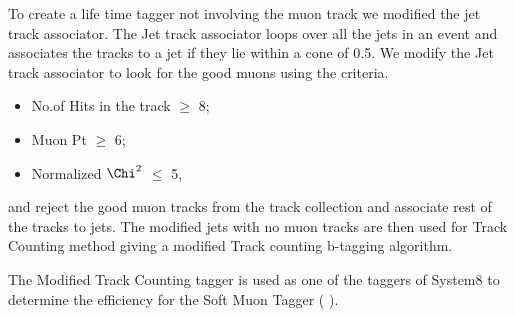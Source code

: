 To create a life time tagger not involving the muon track we modified 
the jet track associator. The Jet track associator  loops over all the jets 
in an event and associates the tracks to a jet if they lie within a cone of 
0.5. We modify the Jet track associator to look for the good muons using the
criteria.
\begin{itemize} 
\item   No.of Hits in the track $ \ge $ 8;
\item   Muon Pt $ \ge $ 6;
\item   Normalized $\Chi^{2} $ $\le $ 5,
\end{itemize}   
and reject the good muon tracks from the track collection and associate rest 
of the tracks to jets. The modified jets with no muon tracks are then used 
for Track Counting method giving a modified Track counting b-tagging algorithm.

The Modified Track Counting tagger is used as one of the taggers of System8 
to determine the efficiency for the Soft Muon Tagger ( \ptrel).


